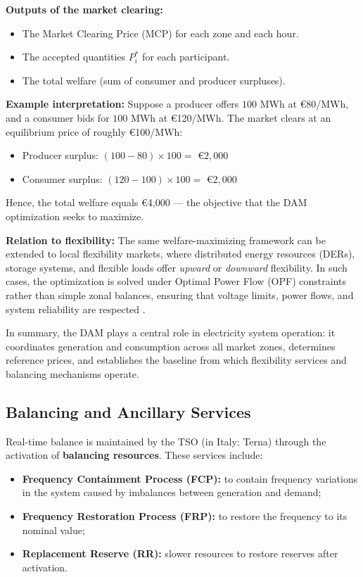 \documentclass[11pt]{article}
\begin{document}
	\medskip
	\noindent\textbf{Outputs of the market clearing:}
	\begin{itemize}
		\item The Market Clearing Price (MCP) for each zone and each hour.
		\item The accepted quantities $P_i^*$ for each participant.
		\item The total welfare (sum of consumer and producer surpluses).
	\end{itemize}
	
	\medskip
	\noindent\textbf{Example interpretation:}  
	Suppose a producer offers $100$ MWh at \euro 80/MWh, and a consumer bids for $100$ MWh at \euro 120/MWh.  
	The market clears at an equilibrium price of roughly \euro 100/MWh:
	\begin{itemize}
		\item Producer surplus: $(100 - 80) \times 100 = $ \euro$ 2{,}000$
		\item Consumer surplus: $(120 - 100) \times 100 = $ \euro$ 2{,}000$
	\end{itemize}
	Hence, the total welfare equals \euro 4,000 — the objective that the DAM optimization seeks to maximize.
	
	\medskip
	\noindent\textbf{Relation to flexibility:}  
	The same welfare-maximizing framework can be extended to local flexibility markets, where distributed energy resources (DERs), storage systems, and flexible loads offer \textit{upward} or \textit{downward} flexibility.  
	In such cases, the optimization is solved under Optimal Power Flow (OPF) constraints rather than simple zonal balances, ensuring that voltage limits, power flows, and system reliability are respected \cite{frank2018opf}.
	
	\medskip
	In summary, the DAM plays a central role in electricity system operation: it coordinates generation and consumption across all market zones, determines reference prices, and establishes the baseline from which flexibility services and balancing mechanisms operate.

	
	\subsection{Balancing and Ancillary Services}
	
	Real-time balance is maintained by the TSO (in Italy: Terna) through the activation of \textbf{balancing resources}.  
	These services include:
	\begin{itemize}
		\item \textbf{Frequency Containment Process (FCP):} to contain frequency variations in the system caused by imbalances between generation and demand;
		\item \textbf{Frequency Restoration Process (FRP):} to restore the frequency to its nominal value;
		\item \textbf{Replacement Reserve (RR):} slower resources to restore reserves after activation.
	\end{itemize}
	
\end{document}
